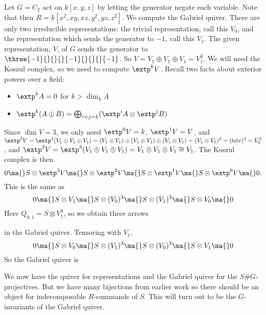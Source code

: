 \begin{ex}
Let $G= C_2$ act on $k[x,y,z]$ by letting the generator negate each variable. Note that then $R= k[x^2,xy,xz,y^2,yz,z^2]$. We compute the Gabriel quiver. There are only two irreducible representations: the trivial representation, call this $V_0$, and the representation which sends the generator to $-1$, call this $V_1$. The given representation, $V$, of $G$ sends the generator to $\three{-1}{}{}{}{-1}{}{}{}{-1}$. So $V= V_1 \oplus V_1 \oplus V_1= V_1^3$. We will need the Koszul complex, so we need to compute $\extp^kV$. Recall two facts about exterior powers over a field:
	\begin{itemize}
	\item $\extp^kA= 0$ for $k> \dim_k A$
	\item $\extp^k (A \oplus B)= \bigoplus_{i+j=k} (\extp^i A \otimes \extp^jB)$
	\end{itemize}
Since $\dim V= 3$, we only need $\extp^0V= k$, $\extp^1V= V$, and $\extp^2V= \extp^2( V_1 \oplus V_1 \oplus V_1)= (V_1 \otimes V_1) \oplus (V_1 \otimes V_1) \oplus (V_1 \otimes V_1)= (V_1 \otimes V_1)^3=(\text{triv})^3= V_0^3$, and $\extp^3V= \extp^3(V_1 \oplus V_1 \oplus V_1)= V_1 \otimes V_1 \otimes V_1 \cong V_1$. The Koszul complex is then 
	\[
	0  \ma{} S \otimes \extp^3V \ma{} S \otimes \extp^2V \ma{} S \otimes \extp^1V \ma{} S \otimes \extp^0V \ma{} 0.
	\]
This is the same as
	\[
	0 \ma{} S \otimes V_1 \ma{} S \otimes (V_0)^3 \ma{} S \otimes (V_1)^3 \ma{} S \otimes V_0 \ma{} 0
	\]
Here $Q_{0,1}= S \otimes V_1^3$, so we obtain three arrows 


in the Gabriel quiver. Tensoring with $V_1$, 
	\[
	0 \ma{} S \otimes V_0 \ma{} S \otimes (V_1)^3 \ma{} S \otimes (V_0)^3 \ma{} S \otimes V_1 \ma{} 0
	\]
So the Gabriel quiver is 

\end{ex}

We now have the \mc quiver for representations and the Gabriel quiver for the $S\#G$-projectives. But we have many bijections from earlier work so there should be an object for indecomposable $R$-summands of $S$. This will turn out to be the $G$-invariants of the Gabriel quiver. 






























